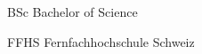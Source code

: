 \tableofcontents

\newpage
\begin{abkuerzungen}
    \item[BSc] Bachelor of Science
    \item[FFHS] Fernfachhochschule Schweiz
\end{abkuerzungen}
